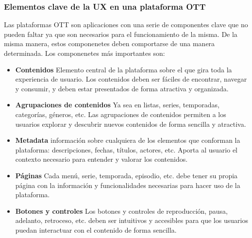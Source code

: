 \subsubsection{Elementos clave de la UX en una plataforma OTT}
\label{subsec:fundamentos_teoricos_ux_elementos}

Las plataformas OTT son aplicaciones con una serie de componentes clave que no pueden faltar ya que son necesarios para 
el funcionamiento de la misma. De la misma manera, estos componenetes deben comportarse de una manera determinada. Los
componenetes más importantes son: 

\begin{itemize}
    \item \textbf{Contenidos} Elemento central de la plataforma sobre el que gira toda la experiencia de usuario. Los contenidos
    deben ser fáciles de encontrar, navegar y consumir, y deben estar presentados de forma atractiva y organizada.
    \item \textbf{Agrupaciones de contenidos} Ya sea en listas, series, temporadas, categorías, géneros, etc. Las agrupaciones
    de contenidos permiten a los usuarios explorar y descubrir nuevos contenidos de forma sencilla y atractiva.
    \item \textbf{Metadata} información sobre cualquiera de los elementos que conforman la plataforma: descripciones, fechas,
    títulos, actores, etc. Aporta al usuario el contexto necesario para entender y valorar los contenidos.
    \item \textbf{Páginas} Cada menú, serie, temporada, episodio, etc. debe tener su propia página con la información y funcionalidades
    necesarias para hacer uso de la plataforma.
    \item \textbf{Botones y controles} Los botones y controles de reproducción, pausa, adelanto, retroceso, etc. deben ser intuitivos
    y accesibles para que los usuarios puedan interactuar con el contenido de forma sencilla.
\end{itemize}

